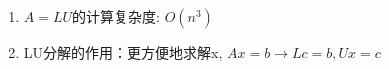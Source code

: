 \documentclass{book}
\begin{document}
\begin{enumerate}
  \item $A=LU$的计算复杂度: $O(n^3)$
  \item LU分解的作用：更方便地求解x, $Ax=b \rightarrow Lc= b, Ux=c$
\end{enumerate}

\end{document}
